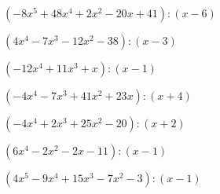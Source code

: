 \begin{esercizio}
\begin{enumeratea}
\item  \(\left(-8 x^5 +48 x^4 +2 x^2 -20 x +41 \right) : \left(x -6 \right)\)
\item  \(\left(4 x^4 -7 x^3 -12 x^2 -38 \right) : \left(x -3 \right)\)
\item  \(\left(-12 x^4 +11 x^3 + x \right) : \left(x -1 \right)\)
\item  \(\left(-4 x^4 -7 x^3 +41 x^2 +23 x  \right) : \left(x +4 \right)\)
\item  \(\left(-4 x^4 +2 x^3 +25 x^2 -20 \right) : \left(x +2 \right)\)
\item  \(\left(6 x^4 -2 x^2 -2 x -11 \right) : \left(x -1 \right)\)
\item  \(\left(4 x^5 -9 x^4 +15 x^3 -7 x^2 -3 \right) : 
    \left(x -1 \right)\)
\end{enumeratea}
\end{esercizio}

